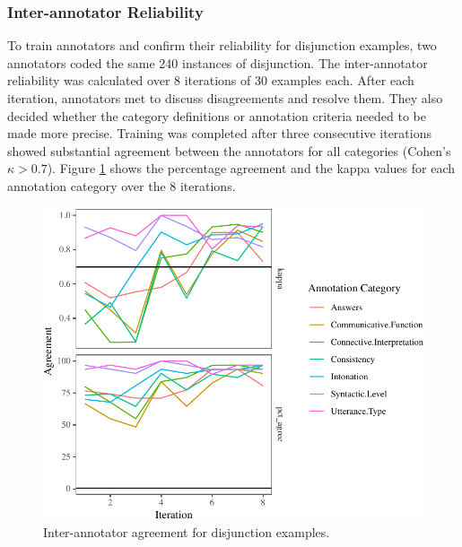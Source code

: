\documentclass[floatsintext,man]{apa6}
\theoremstyle{definition}
\theoremstyle{definition}
\theoremstyle{definition}
\theoremstyle{remark}
\begin{document}
\subsubsection{Inter-annotator
Reliability}\label{inter-annotator-reliability}

To train annotators and confirm their reliability for disjunction
examples, two annotators coded the same 240 instances of disjunction.
The inter-annotator reliability was calculated over 8 iterations of 30
examples each. After each iteration, annotators met to discuss
disagreements and resolve them. They also decided whether the category
definitions or annotation criteria needed to be made more precise.
Training was completed after three consecutive iterations showed
substantial agreement between the annotators for all categories (Cohen's
\(\kappa > 0.7\)). Figure \ref{fig:oReliabilityPlot} shows the
percentage agreement and the kappa values for each annotation category
over the 8 iterations.

\begin{figure}[tb]

{\centering \includegraphics{figs/oReliabilityPlot-1} 

}

\caption{Inter-annotator agreement for disjunction examples.}\label{fig:oReliabilityPlot}
\end{figure}
\end{document}
